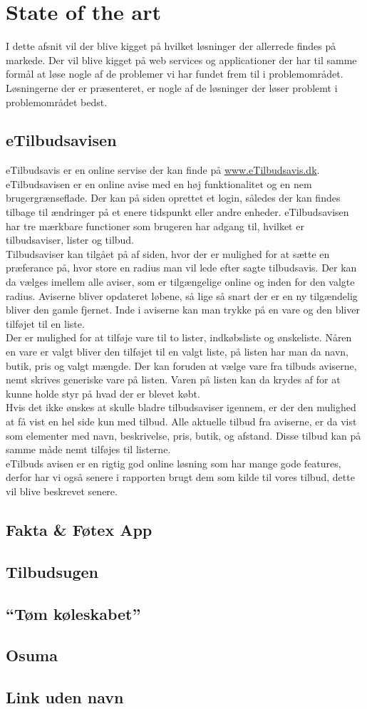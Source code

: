 \chapter{State of the art}
I dette afsnit vil der blive kigget på hvilket løsninger der allerrede findes på markede. Der vil blive kigget på web services og applicationer der har til samme formål at løse nogle af de problemer vi har fundet frem til i problemområdet. Løsningerne der er præsenteret, er nogle af de løsninger der løser problemt i problemområdet bedst. 
\section{eTilbudsavisen}
eTilbudsavis er en online servise der kan finde på \underline{www.eTilbudsavis.dk}. eTilbudsavisen er en online avise med en høj funktionalitet og en nem brugergrænseflade. Der kan på siden oprettet et login, således der kan findes tilbage til ændringer på et enere tidspunkt eller andre enheder. eTilbudsavisen har tre mærkbare functioner som brugeren har adgang til, hvilket er tilbudsaviser, lister og tilbud.\\
Tilbudsaviser kan tilgået på af siden, hvor der er mulighed for at sætte en præferance på, hvor store en radius man vil lede efter sagte tilbudsavis. Der kan da vælges imellem alle aviser, som er tilgængelige online og inden for den valgte radius. Aviserne bliver opdateret løbene, så lige så snart der er en ny tilgændelig bliver den gamle fjernet. Inde i aviserne kan man trykke på en vare og den bliver tilføjet til en liste.\\
Der er mulighed for at tilføje vare til to lister, indkøbsliste og ønskeliste. Nåren en vare er valgt bliver den tilføjet til en valgt liste, på listen har man da navn, butik, pris og valgt mængde. Der kan foruden at vælge vare fra tilbuds aviserne, nemt skrives generiske vare på listen. Varen på listen kan da krydes af for at kunne holde styr på hvad der er blevet købt.\\ 
Hvis det ikke ønskes at skulle bladre tilbudsaviser igennem, er der den mulighed at få vist en hel side kun med tilbud. Alle aktuelle tilbud fra aviserne, er da vist som elementer med navn, beskrivelse, pris, butik, og afstand. Disse tilbud kan på samme måde nemt tilføjes til listerne.\\
eTilbuds avisen er en rigtig god online løsning som har mange gode features, derfor har vi også senere i rapporten brugt dem som kilde til vores tilbud, dette vil blive beskrevet senere.
\section{Fakta \& Føtex App}

\section{Tilbudsugen}

\section{``Tøm køleskabet''}

\section{Osuma}

\section{Link uden navn}